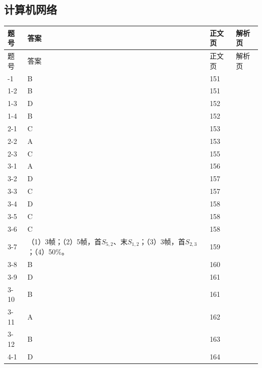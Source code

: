 \documentclass{sidenotes-simplex}
\begin{document}
\subsection*{计算机网络}
{\fontsize{9.3}{12}\selectfont
\begin{longtable}{@{}p{18mm}p{87mm}p{20mm}p{20mm}@{}}\toprule 题号 & 答案 & 正文页 & 解析页 \\ \midrule\endfirsthead\toprule 题号 & 答案 & 正文页 & 解析页 \\ \midrule\endhead\bottomrule\endfoot
1-1 & B & 151 & \hyperref[a:CN01-E01]{\pageref*{a:CN01-E01}} \\
1-2 & B & 151 & \hyperref[a:CN01-E02]{\pageref*{a:CN01-E02}} \\
1-3 & D & 152 & \hyperref[a:CN01-E03]{\pageref*{a:CN01-E03}} \\
1-4 & B & 152 & \hyperref[a:CN01-E04]{\pageref*{a:CN01-E04}} \\
2-1 & C & 153 & \hyperref[a:CN02-E01]{\pageref*{a:CN02-E01}} \\
2-2 & A & 153 & \hyperref[a:CN02-E02]{\pageref*{a:CN02-E02}} \\
2-3 & C & 155 & \hyperref[a:CN02-E03]{\pageref*{a:CN02-E03}} \\
3-1 & A & 156 & \hyperref[a:CN03-E01]{\pageref*{a:CN03-E01}} \\
3-2 & D & 157 & \hyperref[a:CN03-E02]{\pageref*{a:CN03-E02}} \\
3-3 & C & 157 & \hyperref[a:CN03-E03]{\pageref*{a:CN03-E03}} \\
3-4 & D & 158 & \hyperref[a:CN03-E04]{\pageref*{a:CN03-E04}} \\
3-5 & C & 158 & \hyperref[a:CN03-E05]{\pageref*{a:CN03-E05}} \\
3-6 & C & 158 & \hyperref[a:CN03-E06]{\pageref*{a:CN03-E06}} \\
3-7 & （1）3帧；（2）5帧，首\(S_{5,2}\)、末\(S_{1,2}\)；（3）3帧，首\(S_{2,3}\)；（4）50\%。 & 159 & \hyperref[a:CN03-E12]{\pageref*{a:CN03-E12}} \\
3-8 & B & 160 & \hyperref[a:CN03-E07]{\pageref*{a:CN03-E07}} \\
3-9 & D & 161 & \hyperref[a:CN03-E08]{\pageref*{a:CN03-E08}} \\
3-10 & B & 161 & \hyperref[a:CN03-E09]{\pageref*{a:CN03-E09}} \\
3-11 & A & 162 & \hyperref[a:CN03-E10]{\pageref*{a:CN03-E10}} \\
3-12 & B & 163 & \hyperref[a:CN03-E11]{\pageref*{a:CN03-E11}} \\
4-1 & D & 164 & \hyperref[a:CN04-E01]{\pageref*{a:CN04-E01}} \\

\end{longtable}}
\end{document}
